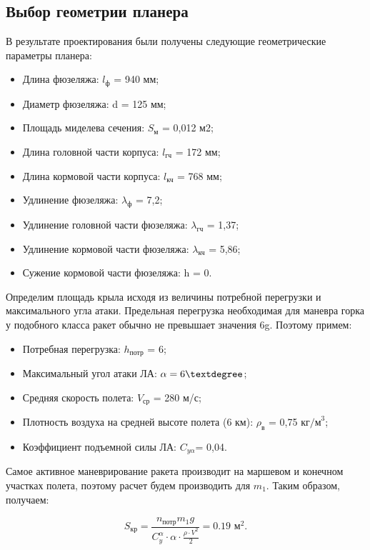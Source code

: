 \subsection{Выбор геометрии планера}
В результате проектирования были получены следующие геометрические параметры планера:
\begin{itemize}
	\item Длина фюзеляжа:						$l_\text{ф} $ = 940 мм;
	\item Диаметр фюзеляжа:						d = 125 мм;
	\item Площадь миделева сечения:				$S_\text{м} $ = 0,012 м2;
	\item Длина головной части корпуса:			$l_\text{гч} $ = 172 мм;
	\item Длина кормовой части корпуса:			$l_\text{кч} $ = 768 мм;
	\item Удлинение фюзеляжа:					$\lambda_\text{ф} $ = 7,2;
	\item Удлинение головной части фюзеляжа:	$\lambda_\text{гч} $ = 1,37;
	\item Удлинение кормовой части фюзеляжа:	$\lambda_\text{кч} $ = 5,86;
	\item Сужение кормовой части фюзеляжа:		h = 0.
\end{itemize}

Определим площадь крыла исходя из величины потребной перегрузки и максимального угла атаки. Предельная перегрузка необходимая для маневра горка у подобного класса ракет обычно не превышает значения 6g. Поэтому примем:
\begin{itemize}
	\item Потребная перегрузка:					            $h_\text{потр}$ = 6;
	\item Максимальный угол атаки ЛА:			                $\alpha = 6\textdegree$;
	\item Средняя скорость полета:				            $V_\text{ср}$ = 280 м/с;
	\item Плотность воздуха на средней высоте полета (6 км):  $\rho_\text{в}$ = 0,75 $\text{кг/м}^3$;
	\item Коэффициент подъемной силы ЛА:	                  	$C_{y\alpha} $= 0,04.
\end{itemize}

Самое активное маневрирование ракета производит на маршевом и конечном участках полета, поэтому расчет будем производить для $m_1$. Таким образом, получаем:

\[
S_\text{кр}=\frac{n_\text{потр}m_1g}{C_y^\alpha \cdot \alpha \cdot \frac{\rho \cdot V^2}{2}}=0.19 \text{ м}^2.
\]

